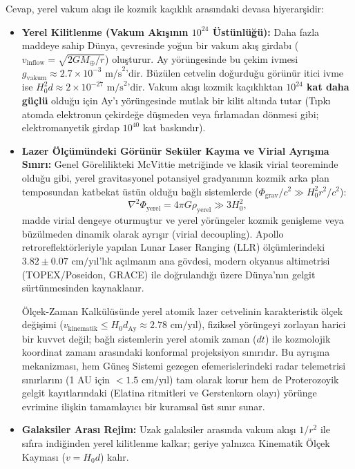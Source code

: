 Cevap, yerel vakum akışı ile kozmik kaçıklık arasındaki devasa hiyerarşidir:
\begin{itemize}
    \item \textbf{Yerel Kilitlenme (Vakum Akışının $10^{24}$ Üstünlüğü):} Daha fazla maddeye sahip Dünya, çevresinde yoğun bir vakum akış girdabı ($v_{\mathrm{inflow}} = \sqrt{2GM_\oplus/r}$) oluşturur. Ay yörüngesinde bu çekim ivmesi $g_{\mathrm{vakum}} \approx 2.7 \times 10^{-3}\text{ m/s}^2$'dir. Büzülen cetvelin doğurduğu görünür itici ivme ise $H_0^2 d \approx 2 \times 10^{-27}\text{ m/s}^2$'dir. Vakum akışı kozmik kaçıklıktan \textbf{$10^{24}$ kat daha güçlü} olduğu için Ay'ı yörüngesinde mutlak bir kilit altında tutar (Tıpkı atomda elektronun çekirdeğe düşmeden veya fırlamadan dönmesi gibi; elektromanyetik girdap $10^{40}$ kat baskındır).
    \item \textbf{Lazer Ölçümündeki Görünür Seküler Kayma ve Virial Ayrışma Sınırı:} Genel Görelilikteki McVittie metriğinde ve klasik virial teoreminde olduğu gibi, yerel gravitasyonel potansiyel gradyanının kozmik arka plan temposundan katbekat üstün olduğu bağlı sistemlerde ($\Phi_{\mathrm{grav}} / c^2 \gg H_0^2 r^2 / c^2$):
          \begin{equation}
              \nabla^2 \Phi_{\mathrm{yerel}} = 4\pi G \rho_{\mathrm{yerel}} \gg 3 H_0^2,
          \end{equation}
          madde virial dengeye oturmuştur ve yerel yörüngeler kozmik genişleme veya büzülmeden dinamik olarak ayrışır (virial decoupling). Apollo retroreflektörleriyle yapılan Lunar Laser Ranging (LLR) ölçümlerindeki $3.82 \pm 0.07\text{ cm/yıl}$'lık açılmanın ana gövdesi, modern okyanus altimetrisi (TOPEX/Poseidon, GRACE) ile doğrulandığı üzere Dünya'nın gelgit sürtünmesinden kaynaklanır.

          Ölçek-Zaman Kalkülüsünde yerel atomik lazer cetvelinin karakteristik ölçek değişimi ($v_{\mathrm{kinematik}} \le H_0 d_{\mathrm{Ay}} \approx 2.78\text{ cm/yıl}$), fiziksel yörüngeyi zorlayan harici bir kuvvet değil; bağlı sistemlerin yerel atomik zaman ($dt$) ile kozmolojik koordinat zamanı arasındaki konformal projeksiyon sınırıdır. Bu ayrışma mekanizması, hem Güneş Sistemi gezegen efemerislerindeki radar telemetrisi sınırlarını (1 AU için $< 1.5\text{ cm/yıl}$) tam olarak korur hem de Proterozoyik gelgit kayıtlarındaki (Elatina ritmitleri ve Gerstenkorn olayı) yörünge evrimine ilişkin tamamlayıcı bir kuramsal üst sınır sunar.
    \item \textbf{Galaksiler Arası Rejim:} Uzak galaksiler arasında vakum akışı $1/r^2$ ile sıfıra indiğinden yerel kilitlenme kalkar; geriye yalnızca Kinematik Ölçek Kayması ($v = H_0 d$) kalır.
\end{itemize}


